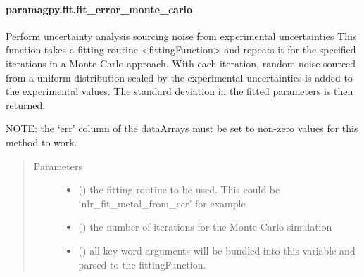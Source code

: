 \documentclass[a4paper,10pt,english,openany,oneside]{sphinxmanual}
\begin{document}
\paragraph{paramagpy.fit.fit\_error\_monte\_carlo}
\label{\detokenize{reference/generated/paramagpy.fit.fit_error_monte_carlo:paramagpy-fit-fit-error-monte-carlo}}\label{\detokenize{reference/generated/paramagpy.fit.fit_error_monte_carlo::doc}}

\begin{fulllineitems}
\label{\detokenize{reference/generated/paramagpy.fit.fit_error_monte_carlo:paramagpy.fit.fit_error_monte_carlo}}
Perform uncertainty analysis sourcing noise from experimental uncertainties
This function takes a fitting routine \textless{}fittingFunction\textgreater{} and repeats it for
the specified iterations in a Monte-Carlo approach. With each iteration,
random noise sourced from a uniform distribution scaled by the experimental
uncertainties is added to the experimental values. The standard deviation in
the fitted parameters is then returned.

NOTE: the ‘err’ column of the dataArrays must be set to non-zero values for
this method to work.
\begin{quote}\begin{description}
\item[{Parameters}] \leavevmode\begin{itemize}
\item {} 
 () \textendash{} the fitting routine to be used.
This could be ‘nlr\_fit\_metal\_from\_ccr’ for example

\item {} 
 () \textendash{} the number of iterations for the Monte-Carlo simulation

\item {} 
 () \textendash{} all key-word arguments will be bundled into this variable and
parsed to the fittingFunction.

\end{itemize}


\end{description}
\end{quote}
\end{fulllineitems}
\end{document}

